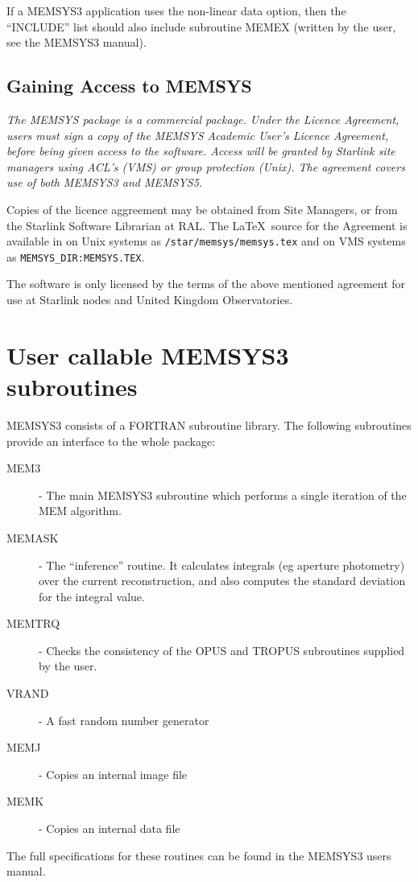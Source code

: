 If a MEMSYS3 application uses the non-linear data option, then the ``INCLUDE''
list  should also include subroutine MEMEX (written by the user, see the 
MEMSYS3 manual).

\subsection{Gaining Access to MEMSYS}
{\em
The MEMSYS package is a commercial package. Under the Licence Agreement, users
must sign a copy of the {\rm MEMSYS Academic User's Licence Agreement}, before
being given access to the software. Access will be granted by Starlink site
managers using ACL's (VMS) or group protection (Unix). The agreement covers 
use of both MEMSYS3 and MEMSYS5.

Copies of the licence aggreement may be obtained from Site Managers, or from
the Starlink Software Librarian at RAL. The \LaTeX\ source for the Agreement is 
available in on Unix systems as {\tt /star/memsys/memsys.tex} and on VMS 
systems as {\tt MEMSYS\_DIR:MEMSYS.TEX}.

The software is only licensed by the terms of the above mentioned agreement
for use at Starlink nodes and United Kingdom Observatories.
}

\appendix
\section {User callable MEMSYS3 subroutines}
MEMSYS3 consists of a FORTRAN subroutine library. The following 
subroutines provide an interface to the whole package:
\begin {description}
\item [MEM3] - The main MEMSYS3 subroutine which performs a single 
iteration of the MEM algorithm.
\item [MEMASK] - The ``inference'' routine. It calculates integrals (eg
aperture photometry) over the current reconstruction, and also computes
the standard deviation for the integral value.
\item [MEMTRQ] - Checks the consistency of the OPUS and TROPUS 
subroutines supplied by the user.
\item [VRAND] - A fast random number generator
\item [MEMJ] - Copies an internal image file
\item [MEMK] - Copies an internal data file
\end {description}
The full specifications for these routines can be found in the MEMSYS3 
users manual.

